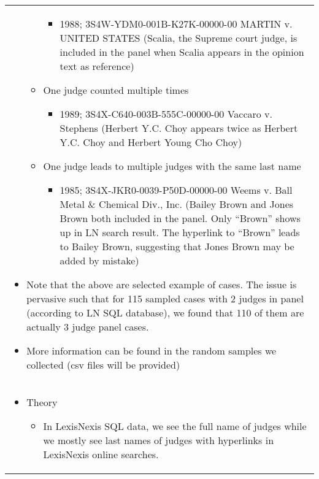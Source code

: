 \documentclass[10pt, letterpaper]{article}
\begin{document}
\begin{spacing}{1.0}
\begin{longtable}{p{6.5in}}
\begin{itemize}
\begin{itemize}
\begin{itemize}
                    \item 1988; 3S4W-YDM0-001B-K27K-00000-00 MARTIN v. UNITED STATES
                    (Scalia, the Supreme court judge, is included in the panel when Scalia appears in the opinion text as reference)
                \end{itemize}
            
                \item One judge counted multiple times
                \begin{itemize} 
                    \item 1989; 3S4X-C640-003B-555C-00000-00 Vaccaro v. Stephens 
                    (Herbert Y.C. Choy appears twice as Herbert Y.C. Choy and Herbert Young Cho Choy)
                \end{itemize}
            
                \item One judge leads to multiple judges with the same last name
                \begin{itemize}                     
                    \item 1985; 3S4X-JKR0-0039-P50D-00000-00 Weems v. Ball Metal \& Chemical Div., Inc.
                    (Bailey Brown and Jones Brown both included in the panel. Only “Brown” shows up in LN search result. The hyperlink to “Brown” leads to Bailey Brown, suggesting that Jones Brown may be added by mistake)
                \end{itemize}
            
            \end{itemize}

        \item Note that the above are selected example of cases. The issue is pervasive such that for 115 sampled cases with 2 judges in panel (according to LN SQL database), we found that 110 of them are actually 3 judge panel cases.
        
        \item More information can be found in the random samples we collected (csv files will be provided)
    \end{itemize}\\
    
    \begin{itemize}
        \item Theory
        \begin{itemize}
            
            \item In LexisNexis SQL data, we see the full name of judges while we mostly see last names of judges with hyperlinks in LexisNexis online searches.
            

\end{itemize}
\end{itemize}
\end{longtable}
\end{spacing}
\end{document}
